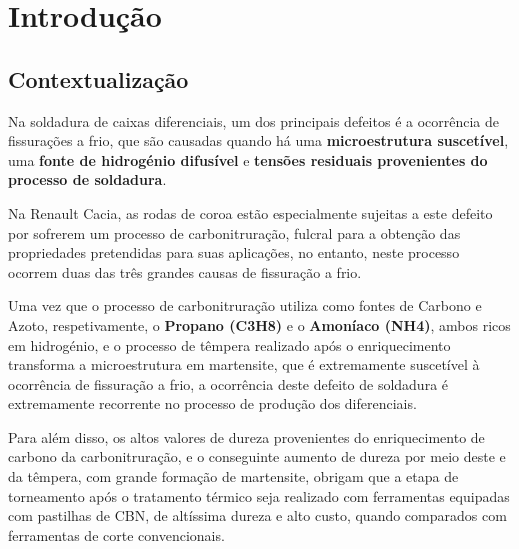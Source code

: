 \chapter{Introdução} \label{ch:intro}
\setlength{\headheight}{13.6pt}

\section{Contextualização} \label{s:intro_contextualizacao}

Na soldadura de caixas diferenciais, um dos principais defeitos é a ocorrência de fissurações a frio, que são causadas quando há uma \textbf{microestrutura suscetível}, uma \textbf{fonte de hidrogénio difusível} e \textbf{tensões residuais provenientes do processo de soldadura}.
\par
Na Renault Cacia, as rodas de coroa estão especialmente sujeitas a este defeito por sofrerem um processo de carbonitruração, fulcral para a obtenção das propriedades pretendidas para suas aplicações, no entanto, neste processo ocorrem duas das três grandes causas de fissuração a frio.
\par
Uma vez que o processo de carbonitruração utiliza como fontes de Carbono e Azoto, respetivamente, o \textbf{Propano (C3H8)} e o \textbf{Amoníaco (NH4)}, ambos ricos em hidrogénio, e o processo de têmpera realizado após o enriquecimento transforma a microestrutura em martensite, que é extremamente suscetível à ocorrência de fissuração a frio, a ocorrência deste defeito de soldadura é extremamente recorrente no processo de produção dos diferenciais.
\par
Para além disso, os altos valores de dureza provenientes do enriquecimento de carbono da carbonitruração, e o conseguinte aumento de dureza por meio deste e da têmpera, com grande formação de martensite, obrigam que a etapa de torneamento após o tratamento térmico seja realizado com ferramentas equipadas com pastilhas de CBN, de altíssima dureza e alto custo, quando comparados com ferramentas de corte convencionais.
